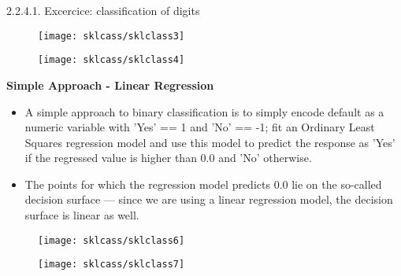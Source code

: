 2.2.4.1. Excercice: classification of digits\documentclass[MASTER.tex]{subfiles}
\begin{document}

	
	\begin{figure}
\centering
\texttt{[image: sklcass/sklclass3]}

\end{figure}

	



\begin{figure}
\centering
\texttt{[image: sklcass/sklclass4]}

\end{figure}


	
	\Large
\textbf{Simple Approach - Linear Regression}
\begin{itemize}
\item A simple approach to binary classification is to simply encode default as a numeric variable with 'Yes' == 1 and 'No' == -1; fit an Ordinary Least Squares regression model and use this model to predict the response as 'Yes' if the regressed value is higher than 0.0 and 'No' otherwise. 
\item The points for which the regression model predicts 0.0 lie on the so-called decision surface — since we are using a linear regression model, the decision surface is linear as well.
\end{itemize}



%
%

\begin{figure}
\centering
\texttt{[image: sklcass/sklclass6]}
\end{figure}



\begin{figure}
\centering
\texttt{[image: sklcass/sklclass7]}

\end{figure}
\end{document}
